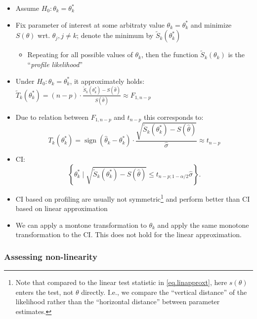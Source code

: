 \documentclass[11pt, %
	oneside, %
	english, %
	onehalfspacing, %
	]{article} %
\numberwithin{equation}{section}
\begin{document}
\begin{itemize}
	\item Assume $H_0: \theta_k=\theta_k^*$
	\item Fix parameter of interest at some arbitraty value $\theta_k=\theta_k^*$ and minimize $S(\theta)$ wrt. $\theta_j, j \neq k$; denote the minimum by $\tilde{S}_k\left(\theta_k^*\right)$
	\begin{itemize}
        \item Repeating for all possible values of $\theta_k$, then the function $\tilde{S}_k\left(\theta_k\right)$ is the ``\emph{profile likelihood}''
    \end{itemize}
	\item Under $H_0: \theta_k=\theta_k^*$, it approximately holds: $\tilde{T}_k\left(\theta_k^*\right)=(n-p) \cdot \frac{\tilde{S}_k\left(\theta_k^*\right)-S(\widehat{\theta})}{S(\widehat{\theta})} \approx F_{1, n-p}$
	\item Due to relation between $F_{1, n-p}$ and $t_{n-p}$ this corresponds to:
    \begin{equation}
        T_k\left(\theta_k^*\right)=\operatorname{sign}\left(\hat{\theta}_k-\theta_k^*\right) \cdot \frac{\sqrt{\tilde{S}_k\left(\theta_k^*\right)-S(\widehat{\theta})}}{\widehat{\sigma}} \approx t_{n-p}
    \end{equation}
    \item CI:
	\begin{equation*}
		\left\{\theta_k^* \mid \sqrt{\tilde{S}_k\left(\theta_k^*\right)-S(\widehat{\theta})} \leq t_{n-p ; 1-\alpha / 2} \widehat{\sigma}\right\} .
	\end{equation*}
	\item CI based on profiling are usually not symmetric\footnote{Note that compared to the linear test statistic in \eqref{eq.linapproxt}, here $s(\theta)$ enters the test, not $\theta$ directly. I.e., we compare the ``vertical distance'' of the likelihood rather than the ``horizontal distance'' between parameter estimates.} and perform better than CI based on linear approximation
	\item We can apply a montone transformation to $\theta_k$ and apply the same monotone transformation to the CI. This does not hold for the linear approximation.
\end{itemize}




\subsubsection{Assessing non-linearity}
\end{document}
